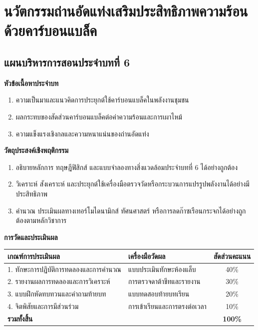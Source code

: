 \chapter{นวัตกรรมถ่านอัดแท่งเสริมประสิทธิภาพความร้อนด้วยคาร์บอนแบล็ค}
\label{chap:ch06}

\section*{แผนบริหารการสอนประจำบทที่ 6}

\noindent\textbf{หัวข้อเนื้อหาประจำบท}
\begin{enumerate}
    \item ความเป็นมาและแนวคิดการประยุกต์ใช้คาร์บอนแบล็คในพลังงานชุมชน
    \item ผลกระทบของสัดส่วนคาร์บอนแบล็คต่อค่าความร้อนและการเผาไหม้
    \item ความแข็งแรงเชิงกลและความหนาแน่นของถ่านอัดแท่ง
\end{enumerate}

\noindent\textbf{วัตถุประสงค์เชิงพฤติกรรม}
\begin{enumerate}
    \item อธิบายหลักการ ทฤษฎีฟิสิกส์ และแบบจำลองทางสิ่งแวดล้อมประจำบทที่ 6 ได้อย่างถูกต้อง
    \item วิเคราะห์ สังเคราะห์ และประยุกต์ใช้เครื่องมือตรวจวัดหรือกระบวนการแปรรูปพลังงานได้อย่างมีประสิทธิภาพ
    \item คำนวณ ประเมินผลทางเทอร์โมไดนามิกส์ ทัศนศาสตร์ หรือการลดก๊าซเรือนกระจกได้อย่างถูกต้องตามหลักวิชาการ
\end{enumerate}

\noindent\textbf{การวัดและประเมินผล}
\begin{table}[H]
\centering\small
\begin{tabularx}{\textwidth}{p{} p{} c}
\toprule
\textbf{เกณฑ์การประเมินผล} & \textbf{เครื่องมือวัดผล} & \textbf{สัดส่วนคะแนน} \\
\midrule
1. ทักษะการปฏิบัติการทดลองและการคำนวณ & แบบประเมินทักษะห้องแล็บ & 40\% \\
2. รายงานผลการทดลองและการวิเคราะห์ & การตรวจดาต้าชีทและรายงาน & 30\% \\
3. แบบฝึกหัดทบทวนและคำถามท้ายบท & แบบทดสอบท้ายบทเรียน & 20\% \\
4. จิตพิสัยและการมีส่วนร่วม & การเข้าเรียนและการตรงต่อเวลา & 10\% \\
\midrule
\textbf{รวมทั้งสิ้น} & & \textbf{100\%} \\
\bottomrule
\end{tabularx}
\end{table}
\newpage

